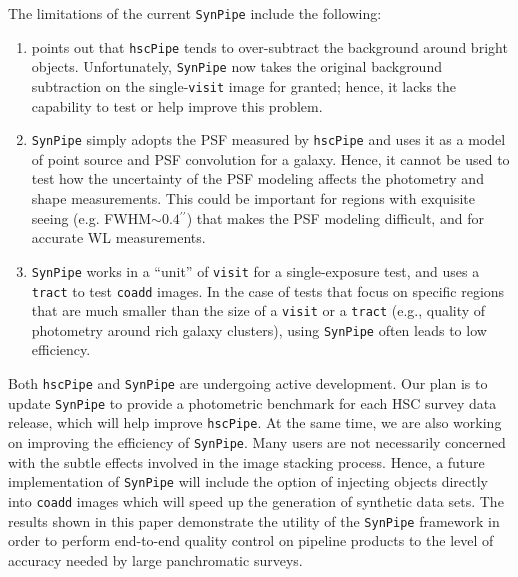 \documentclass[useamsfonts]{pasj01}
\def\asec{$^{\prime\prime}$}
\def\hscpipe{\texttt{hscPipe}}
\def\synpipe{\texttt{SynPipe}}
\def\coadd{\texttt{coadd}}
\def\tract{\texttt{tract}}
\def\visit{\texttt{visit}}
\begin{document}
    The limitations of the current \synpipe{} include the following:

    \begin{enumerate}

        \item \citet{HSCDR1} points out that \hscpipe{} tends to over-subtract the
            background around bright objects.
            Unfortunately, \synpipe{} now takes the original background subtraction on
            the single-\visit{} image for granted; hence, it lacks the capability to
            test or help improve this problem.

        \item  \synpipe{} simply adopts the PSF measured by \hscpipe{} and
            uses it as a model of point source and PSF convolution for a galaxy.
            Hence, it cannot be used to test how the uncertainty of the PSF modeling
            affects the photometry and shape measurements.
            This could be important for regions with exquisite seeing 
            (e.g. FWHM${\sim}0.4$\asec{}) that makes the
            PSF modeling difficult, and for accurate WL measurements.

        \item \synpipe{} works in a ``unit'' of \visit{} for a single-exposure
            test, and uses a \tract{} to test \coadd{} images.
            In the case of tests that focus on specific regions that are much smaller 
            than the size of a \visit{} or a \tract{} (e.g., quality of photometry
            around rich galaxy clusters), using \synpipe{} often leads to
            low efficiency.

    \end{enumerate}

    Both \hscpipe{} and \synpipe{} are undergoing active development. 
    Our plan is to update \synpipe{} to provide a photometric benchmark for
    each HSC survey data release, which will help improve \hscpipe{}.
    At the same time, we are also working on improving the efficiency of \synpipe{}.
    Many users are not necessarily concerned with the subtle effects involved in 
    the image stacking process. Hence, a future implementation of \synpipe{} will include the option of injecting objects directly into  \coadd{} images which will speed up the generation of synthetic data sets. The results shown in this paper demonstrate the  utility of the \synpipe{} framework in order to perform end-to-end quality control on pipeline products to the level of accuracy needed by large panchromatic surveys. 
\end{document}

